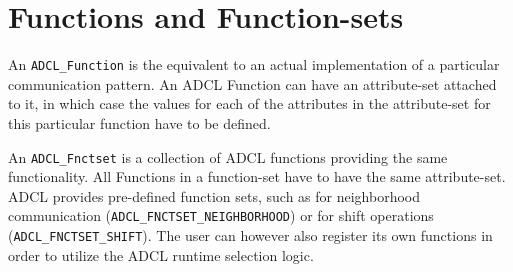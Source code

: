 \section{Functions and Function-sets}

An {\tt ADCL\_Function} is the equivalent to an actual implementation of a particular communication pattern. An ADCL Function can have an attribute-set attached to it, in which case the values for each of the attributes in the attribute-set for this particular function have to be defined.


An {\tt ADCL\_Fnctset} is a collection of ADCL functions providing the same functionality. All Functions in a function-set have to have the same attribute-set. ADCL provides pre-defined function sets, such as for neighborhood communication ({\tt ADCL\_FNCTSET\_NEIGHBORHOOD}) or for shift operations ({\tt ADCL\_FNCTSET\_SHIFT}). The user can however also register its own functions in order to utilize the ADCL runtime selection logic.